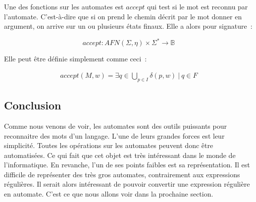 Une des fonctions sur les automates est \(accept\) qui test si le mot est
reconnu par l'automate. C'est-à-dire que si on prend le chemin décrit par le
mot donner en argument, on arrive sur un ou plusieurs états finaux. Elle a
alors pour signature~:

\[
    accept: AFN(\Sigma, \eta) \times \Sigma^* \to \mathbb{B}
\]

Elle peut être définie simplement comme ceci~:

\begin{align*}
    accept(M, w) = \exists q \in \bigcup_{p \in I} \delta(p, w) ~|~ q \in F
\end{align*}

\subsection{Conclusion}

Comme nous venons de voir, les automates sont des outils puissants pour
reconnaitre des mots d'un langage. L'une de leurs grandes forces est leur
simplicité. Toutes les opérations sur les automates peuvent donc être
automatisées. Ce qui fait que cet objet est très intéressant dans le monde de
l'informatique. En revanche, l'un de ses points faibles est sa représentation.
Il est difficile de représenter des très gros automates, contrairement aux
expressions régulières. Il serait alors intéressant de pouvoir convertir une
expression régulière en automate. C'est ce que nous allons voir dans la
prochaine section.
